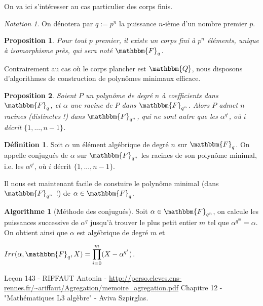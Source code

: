 \documentclass[12pt]{article}
\newcommand{\Q}{\mathbbm{Q}}
\newcommand{\Fq}{\mathbbm{F}_q}
\newcommand{\Fqn}{\mathbbm{F}_{q^n}}
\newtheorem{prop}{Proposition}
\theoremstyle{definition}\newtheorem{defn}{Définition}
\theoremstyle{definition}\newtheorem{exm}{Exemple}
\theoremstyle{definition}\newtheorem{rem}{Remarque}
\theoremstyle{definition}\newtheorem{algo}{Algorithme}
\theoremstyle{remark}\newtheorem{exo}{Exercice}
\theoremstyle{remark}\newtheorem{nota}{Notation}
\begin{document}
On va ici s'intéresser au cas particulier des corps finis.

\begin{nota}
On dénotera par $q := p^n$ la puissance $n$-ième d'un nombre premier $p$.
\end{nota}

\begin{prop}
Pour tout $p$ premier, il existe un corps fini à $p^n$ éléments, unique à isomorphisme près, qui sera noté $\Fq$.
\end{prop}

Contrairement au cas où le corps plancher est $\Q$, nous disposons d'algorithmes de construction de polynômes minimaux efficace. 

\begin{prop}
Soient $P$ un polynôme de degré $n$ à coefficients dans $\Fq$, et $\alpha$ une racine de $P$ dans $\Fqn$. Alors $P$ admet $n$ racines (distinctes !) dans $\Fqn$, qui ne sont autre que les $\alpha^{q^i}$, où $i$ décrit $\{1, ..., n-1\}$.
\end{prop}

\begin{defn}
Soit $\alpha$ un élément algébrique de degré $n$ sur $\Fq$. On appelle conjugués de $\alpha$ sur $\Fqn$ les racines de son polynôme minimal, i.e. les $\alpha^{q^i}$, où $i$ décrit $\{1, ..., n-1\}$.
\end{defn}

Il nous est maintenant facile de constuire le polynôme minimal (dans $\Fqn$ !) de $\alpha \in \Fq$.

\begin{algo}[Méthode des conjugués]
Soit $\alpha \in \Fqn$, on calcule les puissances successive de $\alpha^{q}$ jusqu'à trouver le plus petit entier $m$ tel que $\alpha^{q^m} = \alpha$. On obtient ainsi que $\alpha$ est algébrique de degré $m$ et 
\begin{center} $Irr(\alpha, \Fq, X) = \displaystyle \prod_{i=0}^m (X-\alpha^{q^i})$. \end{center}
\end{algo}



\pagebreak


\begin{thebibliography}{9}
	Leçon 143 - RIFFAUT Antonin - \url{http://perso.eleves.ens-rennes.fr/~ariffaut/Agregation/memoire_agregation.pdf}
	Chapitre 12 - "Mathématiques L3 algèbre" - Aviva Szpirglas.
\end{thebibliography}
\end{document}
